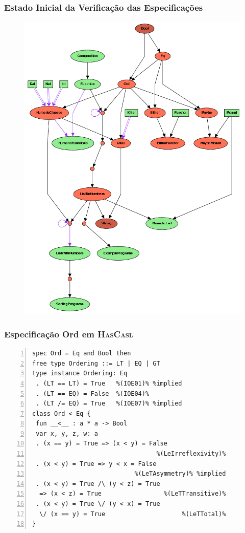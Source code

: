 \documentclass{beamer}
\newcommand{\HasCASL}{\textsc{HasCasl}\xspace}
\begin{document}
\begin{frame}
	\frametitle{Estado Inicial da Verificação das Especificações}
\begin{figure}
\centering
\includegraphics[height=0.9\textheight]{figuras/ProofStart.png}
\end{figure}
\end{frame}

\begin{frame}[containsverbatim]
	\frametitle{Especificação Ord em \HasCASL}

\renewcommand{\FancyVerbFormatLine}[1]{%
	\ifthenelse{%
		\equal{\value{FancyVerbLine}}{10}%
		\or%
		\equal{\value{FancyVerbLine}}{11}%
		\or%
		\equal{\value{FancyVerbLine}}{12}%
		\or%
		\equal{\value{FancyVerbLine}}{13}%
	}{%
	 	\textcolor{red!60!black}{#1}%
	}{%
		{#1}%
	}%
}
	
\begin{Verbatim}[numbers=left,numbersep=3pt]
spec Ord = Eq and Bool then
free type Ordering ::= LT | EQ | GT
type instance Ordering: Eq
 . (LT == LT) = True   %(IOE01)% %implied
 . (LT == EQ) = False  %(IOE04)%
 . (LT /= EQ) = True   %(IOE07)% %implied
class Ord < Eq {
 fun __<__ : a * a -> Bool
 var x, y, z, w: a
 . (x == y) = True => (x < y) = False
                                  %(LeIrreflexivity)%
 . (x < y) = True => y < x = False
                            %(LeTAsymmetry)% %implied
 . (x < y) = True /\ (y < z) = True
  => (x < z) = True                 %(LeTTransitive)%
 . (x < y) = True \/ (y < x) = True
  \/ (x == y) = True                     %(LeTTotal)%
}
\end{Verbatim}
\end{frame}
\end{document}
